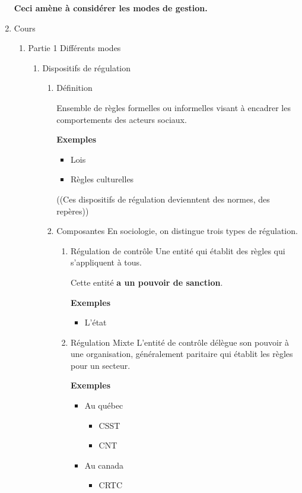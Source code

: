 \documentclass[11pt]{article}
\begin{document}
\begin{enumerate}
\textbf{Ceci amène à considérer les modes de gestion.}
\item Cours
\label{sec:orgce667a2}
\begin{enumerate}
\item Partie 1 Différents modes
\label{sec:orgd37b6f5}
\begin{enumerate}
\item Dispositifs de régulation
\label{sec:orge909a59}
\begin{enumerate}
\item Définition
\label{sec:org9363062}

Ensemble de règles formelles ou informelles visant à encadrer les comportements
des acteurs sociaux.

\textbf{Exemples}
\begin{itemize}
\item Lois
\item Règles culturelles
\end{itemize}
((Ces dispositifs de régulation devienntent des normes, des repères))
\item Composantes
\label{sec:orgfc67596}
En sociologie, on distingue trois types de régulation.
\begin{enumerate}
\item Régulation de contrôle
\label{sec:org65a1be3}
Une entité qui établit des règles qui s'appliquent à tous.

Cette entité \textbf{a un pouvoir de sanction}.

\textbf{Exemples}
\begin{itemize}
\item L'état
\end{itemize}

\item Régulation Mixte
\label{sec:orgbbe771c}
L'entité de contrôle délègue son pouvoir à une organisation, généralement
paritaire qui établit les règles pour un secteur.

\textbf{Exemples}
\begin{itemize}
\item Au québec
\begin{itemize}
\item CSST
\item CNT
\end{itemize}
\item Au canada
\begin{itemize}
\item CRTC
\end{itemize}
\end{itemize}


\end{enumerate}
\end{enumerate}
\end{enumerate}
\end{enumerate}
\end{enumerate}
\end{document}
